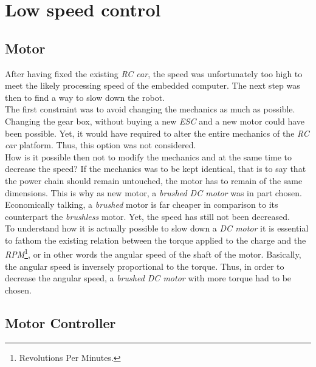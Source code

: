 	\section{Low speed control}\label{motor}
	
		\subsection{Motor}
		
		After having fixed the existing \textit{RC car}, the speed was unfortunately 
		too high to meet the likely processing speed of the embedded computer.
		The next step
		was then to find a way to slow down the robot. 
		\\\indent The first constraint was to avoid changing the mechanics as much as
		possible. Changing the gear box, without buying a new \textit{ESC} and a new
		motor could have been possible. Yet, it would have required to alter 
		the entire mechanics of the \textit{RC car} platform. Thus, this option was 
		not considered.
		\\\indent How is it possible then not to modify the mechanics and
		at the same time to decrease the speed? If the mechanics was to 
		be kept identical, that is to say that the power chain should 
		remain untouched, the motor has to remain of the same dimensions.
		This is why as new motor, a \textit{brushed DC motor} was in part 
		chosen. Economically talking, a \textit{brushed} motor is far cheaper
		in comparison to its counterpart the \textit{brushless} motor. Yet, the
		speed has still not been decreased.
		\\\indent To understand how it is actually possible to 
		slow down a \textit{DC motor} it is essential to fathom the 
		existing relation between the torque applied to the charge
		and the \textit{RPM}\footnote{Revolutions Per Minutes.},
		or in other words the angular speed 
		of the shaft of the motor. Basically, the angular speed is
		inversely proportional 
		to the torque. Thus, in order to decrease the angular speed, a 
		\textit{brushed DC motor} with more torque had to be chosen. \cite{bonanza, motor}
		
		\subsection{Motor Controller}
		
